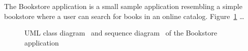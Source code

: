 The Bookstore application is a small sample application resembling a simple %
bookstore where a user can search for books in an online catalog. %
Figure~\ref{fig:bookstore:classAndSequenceDiagrams} \ldots

\begin{figure}[h]\centering
{}%
\caption{UML class diagram~ and %
sequence diagram~ of the Bookstore application}
\label{fig:bookstore:classAndSequenceDiagrams}
\end{figure}


